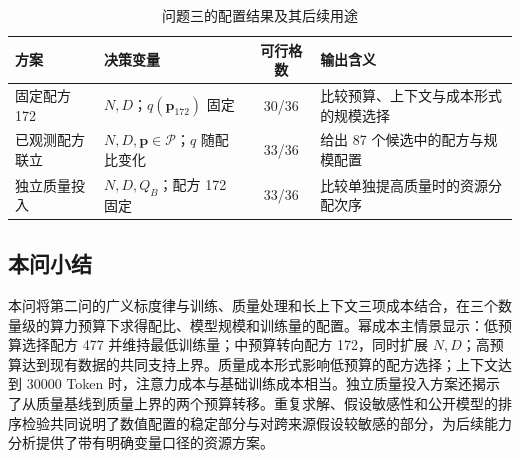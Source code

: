 \begin{table}[htbp]
 \centering\small
 \caption{问题三的配置结果及其后续用途}
 \label{tab:q3-output}
 \begin{tabular}{lp{4.0cm}cp{5.0cm}}
 \toprule
 方案 & 决策变量 & 可行格数 & 输出含义\\
 \midrule
 固定配方 172 & $N,D$；$q(\boldsymbol p_{172})$ 固定 & 30/36 & 比较预算、上下文与成本形式的规模选择\\
 已观测配方联立 & $N,D,\boldsymbol p\in\mathcal P$；$q$ 随配比变化 & 33/36 & 给出 87 个候选中的配方与规模配置\\
 独立质量投入 & $N,D,Q_B$；配方 172 固定 & 33/36 & 比较单独提高质量时的资源分配次序\\
 \bottomrule
 \end{tabular}
\end{table}

\subsection{本问小结}

本问将第二问的广义标度律与训练、质量处理和长上下文三项成本结合，在三个数量级的算力预算下求得配比、模型规模和训练量的配置。幂成本主情景显示：低预算选择配方 477 并维持最低训练量；中预算转向配方 172，同时扩展 $N,D$；高预算达到现有数据的共同支持上界。质量成本形式影响低预算的配方选择；上下文达到 30000 Token 时，注意力成本与基础训练成本相当。独立质量投入方案还揭示了从质量基线到质量上界的两个预算转移。重复求解、假设敏感性和公开模型的排序检验共同说明了数值配置的稳定部分与对跨来源假设较敏感的部分，为后续能力分析提供了带有明确变量口径的资源方案。
